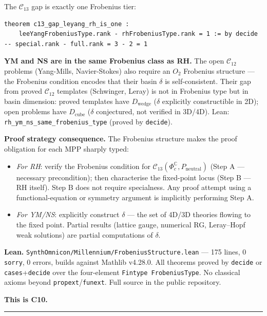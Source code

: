 \documentclass[12pt,a4paper]{article}
\begin{document}
The $\mathcal{C}_{13}$ gap is exactly one Frobenius tier:

\begin{lstlisting}[language=lean]
theorem c13_gap_leyang_rh_is_one :
    leeYangFrobeniusType.rank - rhFrobeniusType.rank = 1 := by decide
-- special.rank - full.rank = 3 - 2 = 1
\end{lstlisting}

\textbf{YM and NS are in the same Frobenius class as RH.} The open $\mathcal{C}_{12}$ problems (Yang-Mills, Navier-Stokes) also require an $O_2$ Frobenius structure --- the Frobenius condition encodes that their basin $\delta$ is self-consistent. Their gap from proved $\mathcal{C}_{12}$ templates (Schwinger, Leray) is not in Frobenius type but in basin dimension: proved templates have $D_\text{wedge}$ ($\delta$ explicitly constructible in 2D); open problems have $D_\text{cube}$ ($\delta$ conjectured, not verified in 3D/4D). Lean: \texttt{rh\_ym\_ns\_same\_frobenius\_type} (proved by \texttt{decide}).

\textbf{Proof strategy consequence.} The Frobenius structure makes the proof obligation for each MPP sharply typed:

\begin{itemize}
    \item \emph{For RH}: verify the Frobenius condition for $\mathcal{C}_{13}(\Phi_c^{\mathbb{C}}, P_\text{neutral})$ (Step A --- necessary precondition); then characterise the fixed-point locus (Step B --- RH itself). Step B does not require specialness. Any proof attempt using a functional-equation or symmetry argument is implicitly performing Step A.
    \item \emph{For YM/NS}: explicitly construct $\delta$ --- the set of 4D/3D theories flowing to the fixed point. Partial results (lattice gauge, numerical RG, Leray--Hopf weak solutions) are partial computations of $\delta$.
\end{itemize}

\textbf{Lean.} \texttt{SynthOmnicon/Millennium/FrobeniusStructure.lean} --- 175 lines, 0 \texttt{sorry}, 0 errors, builds against Mathlib v4.28.0. All theorems proved by \texttt{decide} or \texttt{cases}+\texttt{decide} over the four-element \texttt{Fintype FrobeniusType}. No classical axioms beyond \texttt{propext}/\texttt{funext}. Full source in the public repository.

\textbf{This is C10.}

\begin{center}
\rule{0.5\textwidth}{0.4pt}
\end{center}
\end{document}
